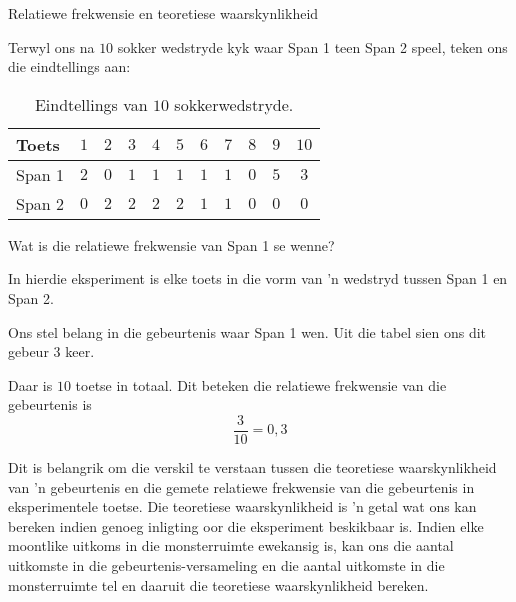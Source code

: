 
\begin{wex}{Relatiewe frekwensie en teoretiese waarskynlikheid}{
  Terwyl ons na $10$ sokker wedstryde kyk waar Span 1 teen Span 2 speel, teken ons die eindtellings aan:
  \begin{table}[h]
    \begin{center}
      \begin{tabular}{lcccccccccc}
        \toprule
        Toets  & $1$ & $2$ & $3$ & $4$ & $5$ & $6$ & $7$ & $8$ & $9$ & $10$ \\
        \midrule
        Span 1 & $2$ & $0$ & $1$ & $1$ & $1$ & $1$ & $1$ & $0$ & $5$ & $3$ \\
        Span 2 & $0$ & $2$ & $2$ & $2$ & $2$ & $1$ & $1$ & $0$ & $0$ & $0$ \\
        \bottomrule
      \end{tabular}
    \end{center}
    \caption{Eindtellings van $10$ sokkerwedstryde.}
  \end{table}
  Wat is die relatiewe frekwensie van Span 1 se wenne?
}{
  In hierdie eksperiment is elke toets in die vorm van 'n wedstryd tussen Span 1 en Span 2.


  Ons stel belang in die gebeurtenis waar Span 1 wen. Uit die tabel sien ons dit gebeur $3$ keer.


  Daar is $10$ toetse in totaal. Dit beteken die relatiewe frekwensie van die gebeurtenis is \[\frac{3}{10} = 0,3\]
}
\end{wex}

Dit is belangrik om die verskil te verstaan tussen die teoretiese waarskynlikheid van 'n gebeurtenis en die gemete relatiewe frekwensie van die gebeurtenis in eksperimentele toetse. Die teoretiese waarskynlikheid is 'n getal wat ons kan bereken indien genoeg inligting oor die eksperiment beskikbaar is. Indien elke moontlike uitkoms in die monsterruimte ewekansig is, kan ons die aantal uitkomste in die gebeurtenis-versameling en die aantal uitkomste in die monsterruimte tel en daaruit die teoretiese waarskynlikheid bereken.

